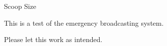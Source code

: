 \setHeadlines
{
}

\begin{recipe}
[ %
%	
]
{Scoop Size}

    This is a test of the emergency broadcasting system.
	
	Please let this work as intended.

\end{recipe}
